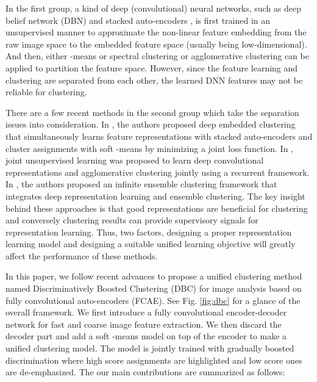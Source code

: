 \documentclass[preprint,12pt]{elsarticle}
\begin{document}
In the first group, a kind of deep (convolutional) neural networks, such as deep belief network (DBN) \cite{Hinton2006DBN}
and stacked auto-encoders \cite{Tian2014graph}, is first trained in an unsupervised manner to approximate
the non-linear feature embedding from the raw image space to the embedded feature space (usually being low-dimensional).
And then, either -means or spectral clustering or agglomerative clustering can be applied to partition
the feature space. However, since the feature learning and clustering are separated from each other,
the learned DNN features may not be reliable for clustering.

There are a few recent methods in the second group which take the separation issues into consideration.
In \cite{Xie2015DEC}, the authors proposed deep embedded clustering that simultaneously learns feature representations
with stacked auto-encoders and cluster assignments with soft -means by minimizing a joint loss function.
In \cite{Yang2016JULE}, joint unsupervised learning was proposed to learn deep convolutional representations
and agglomerative clustering jointly using a recurrent framework.
In \cite{Liu2016IEC}, the authors proposed an infinite ensemble clustering framework that integrates
deep representation learning and ensemble clustering.
The key insight behind these approaches is that good representations are beneficial for clustering and conversely
clustering results can provide supervisory signals for representation learning.
Thus, two factors, designing a proper representation learning model and designing a suitable unified
learning objective will greatly affect the performance of these methods.

In this paper, we follow recent advances to propose a unified clustering method named Discriminatively Boosted
Clustering (DBC) for image analysis based on fully convolutional auto-encoders (FCAE). See Fig. \ref{fig:dbc}
for a glance of the overall framework. We first introduce a fully convolutional encoder-decoder network for fast
and coarse image feature extraction. We then discard the decoder part and add a soft -means model on top of
the encoder to make a unified clustering model. The model is jointly trained with gradually boosted discrimination
where high score assignments are highlighted and low score ones are de-emphasized. The our main contributions are
summarized as follows:
\end{document}
